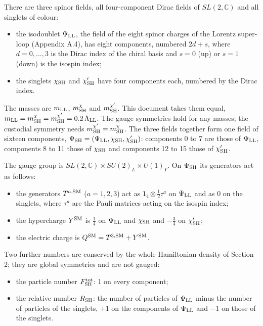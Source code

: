 \documentclass[
  10pt,
]{article}
\providecommand{\tightlist}{%
  \setlength{\itemsep}{0pt}\setlength{\parskip}{0pt}}
\begin{document}
There are three spinor fields, all four-component Dirac fields of
\(SL(2,\mathbb C)\) and all singlets of colour:

\begin{itemize}
\tightlist
\item
  the isodoublet \(\Psi_{\rm LL}\), the field of the eight spinor
  charges of the Lorentz super-loop (Appendix A.4), has eight
  components, numbered \(2d+s\), where \(d=0,\dots,3\) is the Dirac
  index of the chiral basis and \(s=0\) (up) or \(s=1\) (down) is the
  isospin index;
\item
  the singlets \(\chi_{\rm SH}\) and \(\chi'_{\rm SH}\) have four
  components each, numbered by the Dirac index.
\end{itemize}

The masses are \(m_{\rm LL}\), \(m^\chi_{\rm SH}\) and
\(m^{\chi'}_{\rm SH}\). This document takes them equal,
\(m_{\rm LL}=m^\chi_{\rm SH}=m^{\chi'}_{\rm SH}=0.2\,\Lambda_{\rm LL}\).
The gauge symmetries hold for any masses; the custodial symmetry needs
\(m^{\chi'}_{\rm SH}=m^\chi_{\rm SH}\). The three fields together form
one field of sixteen components,
\(\Psi_{\rm SH}=(\Psi_{\rm LL},\chi_{\rm SH},\chi'_{\rm SH})\):
components 0 to 7 are those of \(\Psi_{\rm LL}\), components 8 to 11
those of \(\chi_{\rm SH}\) and components 12 to 15 those of
\(\chi'_{\rm SH}\).

The gauge group is \(SL(2,\mathbb C)\times SU(2)_L\times U(1)_Y\). On
\(\Psi_{\rm SH}\) its generators act as follows:

\begin{itemize}
\tightlist
\item
  the generators \(T^{a,{\rm SM}}\) (\(a=1,2,3\)) act as
  \(\mathsf 1_4\otimes\tfrac12\tau^a\) on \(\Psi_{\rm LL}\) and as 0 on
  the singlets, where \(\tau^a\) are the Pauli matrices acting on the
  isospin index;
\item
  the hypercharge \(Y^{\rm SM}\) is \(\tfrac14\) on \(\Psi_{\rm LL}\)
  and \(\chi_{\rm SH}\) and \(-\tfrac34\) on \(\chi'_{\rm SH}\);
\item
  the electric charge is \(Q^{\rm SM}=T^{3,{\rm SM}}+Y^{\rm SM}\).
\end{itemize}

Two further numbers are conserved by the whole Hamiltonian density of
Section 2; they are global symmetries and are not gauged:

\begin{itemize}
\tightlist
\item
  the particle number \(F^{\rm tot}_{\rm SH}\): 1 on every component;
\item
  the relative number \(R_{\rm SH}\): the number of particles of
  \(\Psi_{\rm LL}\) minus the number of particles of the singlets,
  \(+1\) on the components of \(\Psi_{\rm LL}\) and \(-1\) on those of
  the singlets.
\end{itemize}
\end{document}

